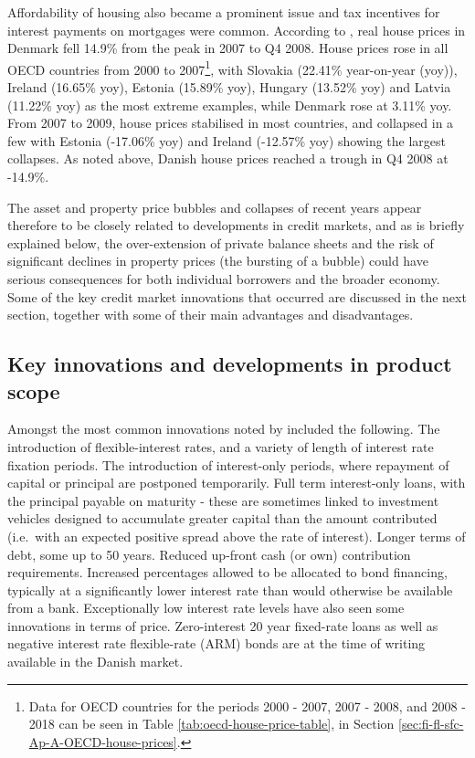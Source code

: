 \documentclass[
]{book}
\begin{document}
Affordability of housing also became a prominent issue and tax incentives for interest payments on mortgages were common. According to \citet{scanlon2011}, real house prices in Denmark fell 14.9\% from the peak in 2007 to Q4 2008. House prices rose in all OECD countries from 2000 to 2007\footnote{Data for OECD countries for the periods 2000 - 2007, 2007 - 2008, and 2008 - 2018 can be seen in Table \ref{tab:oecd-house-price-table}, in Section \ref{sec:fi-fl-sfc-Ap-A-OECD-house-prices}.}, with Slovakia (22.41\% year-on-year (yoy)), Ireland (16.65\% yoy), Estonia (15.89\% yoy), Hungary (13.52\% yoy) and Latvia (11.22\% yoy) as the most extreme examples, while Denmark rose at 3.11\% yoy. From 2007 to 2009, house prices stabilised in most countries, and collapsed in a few with Estonia (-17.06\% yoy) and Ireland (-12.57\% yoy) showing the largest collapses. As noted above, Danish house prices reached a trough in Q4 2008 at -14.9\%.

The asset and property price bubbles and collapses of recent years appear therefore to be closely related to developments in credit markets, and as is briefly explained below, the over-extension of private balance sheets and the risk of significant declines in property prices (the bursting of a bubble) could have serious consequences for both individual borrowers and the broader economy. Some of the key credit market innovations that occurred are discussed in the next section, together with some of their main advantages and disadvantages.

\hypertarget{key-innovations-and-developments-in-product-scope}{%
\subsection{Key innovations and developments in product scope}\label{key-innovations-and-developments-in-product-scope}}

Amongst the most common innovations noted by \citet{scanlon2008} included the following. The introduction of flexible-interest rates, and a variety of length of interest rate fixation periods. The introduction of interest-only periods, where repayment of capital or principal are postponed temporarily. Full term interest-only loans, with the principal payable on maturity - these are sometimes linked to investment vehicles designed to accumulate greater capital than the amount contributed (i.e.~with an expected positive spread above the rate of interest). Longer terms of debt, some up to 50 years. Reduced up-front cash (or own) contribution requirements. Increased percentages allowed to be allocated to bond financing, typically at a significantly lower interest rate than would otherwise be available from a bank. Exceptionally low interest rate levels have also seen some innovations in terms of price. Zero-interest 20 year fixed-rate loans as well as negative interest rate flexible-rate (ARM) bonds are at the time of writing available in the Danish market.
\end{document}
